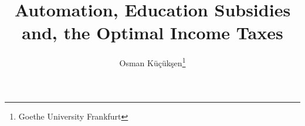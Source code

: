 \documentclass[12pt]{article}
\begin{document}
	
	\title{Automation, Education Subsidies and, the Optimal Income Taxes}
	\author{Osman K\"u\c{c}\"uk\c{s}en\footnote{Goethe University Frankfurt}}
	\date{}
	\maketitle
	
	

	\clearpage
	\newpage
	
	
	\clearpage
	\newpage
	
	
	
	
	
	
\end{document}

